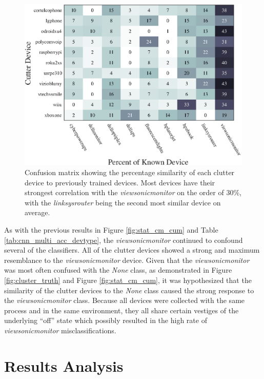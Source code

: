 \begin{figure}[tb]
	\includegraphics[width=\textwidth]{./dasp_algorithm_results/dasp_cnn_clutter_device_percentage.eps}
	\centering
	\caption{Confusion matrix showing the percentage similarity of each clutter device to previously trained devices.  Most devices have their strongest correlation with the \textit{viewsonicmonitor} on the order of $30\%$, with the \textit{linksysrouter} being the second most similar device on average.}
	\label{fig:cnn_clutter_percent}
\end{figure}

As with the previous results in Figure \ref{fig:stat_cm_cum} and Table \ref{tab:cnn_multi_acc_devtype}, the \textit{viewsonicmonitor} continued to confound several of the classifiers.  All of the clutter devices showed a strong and maximum resemblance to the \textit{viewsonicmonitor} device.   Given that the \textit{viewsonicmonitor} was most often confused with the \textit{None} class, as demonstrated in Figure \ref{fig:cluster_truth} and Figure \ref{fig:stat_cm_cum}, it was hypothesized that the similarity of the clutter devices to the \textit{None} class caused the strong response to the \textit{viewsonicmonitor} class.   Because all devices were collected with the same process and in the same environment, they all share certain vestiges of the underlying ``off'' state which possibly resulted in the high rate of \textit{viewsonicmonitor} misclassifications.

\section[Results Analysis]{Results Analysis}
\label{Results Analysis}

